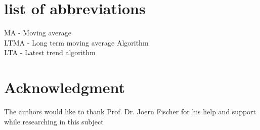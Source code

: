 \documentclass[conference]{IEEEtran}
\begin{document}
%


\appendix
\section*{list of abbreviations}
MA - Moving average
\\
LTMA - Long term moving average Algorithm
\\
LTA - Latest trend algorithm

\section*{Acknowledgment}

The authors would like to thank Prof. Dr. Joern Fischer for his help and support while researching in this subject




\ifCLASSOPTIONcaptionsoff
  \newpage
\fi





%
%
%
\end{document}
